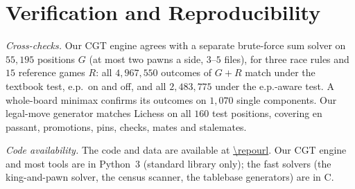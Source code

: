 \providecommand{\codeavail}{available at \expandafter\url\expandafter{\repourl}}

\section{Verification and Reproducibility}\label{sec:verify}

\emph{Cross-checks.} Our CGT engine agrees with a separate brute-force sum solver on $55{,}195$ positions $G$
(at most two pawns a side, $3$--$5$ files), for three race rules and $15$ reference games $R$: all
$4{,}967{,}550$ outcomes of $G+R$ match under the textbook test, e.p.\ on and off, and all $2{,}483{,}775$
under the e.p.-aware test. A whole-board minimax confirms its outcomes on $1{,}070$ single components. Our
legal-move generator matches Lichess on all $160$ test positions, covering en passant, promotions, pins, checks,
mates and stalemates.

\emph{Code availability.} The code and data are \codeavail. Our CGT engine and most tools are in
Python~3 (standard library only); the fast solvers (the king-and-pawn solver, the census scanner, the tablebase
generators) are in C.
